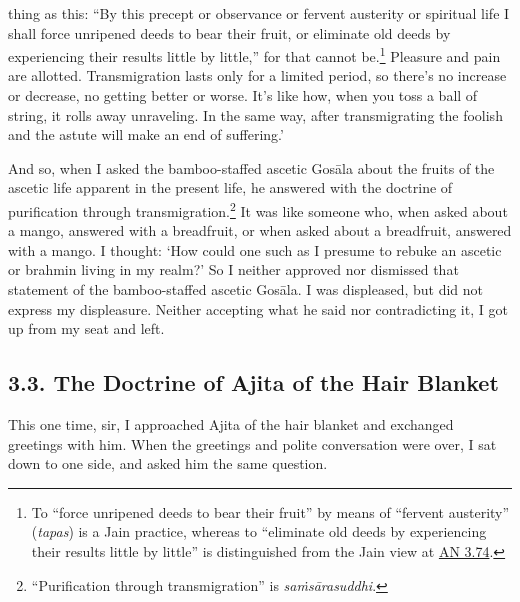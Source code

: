 \documentclass[12pt,openany]{book}%
\begin{document}
thing as this: “By this precept or observance or fervent austerity or spiritual life I shall force unripened deeds to bear their fruit, or eliminate old deeds by experiencing their results little by little,” for that cannot be.\footnote{To “force unripened deeds to bear their fruit” by means of “fervent austerity” (\textit{tapas}) is a Jain practice, whereas to “eliminate old deeds by experiencing their results little by little” is distinguished from the Jain view at \href{https://suttacentral.net/an3.74/en/sujato}{AN 3.74}. } Pleasure and pain are allotted. Transmigration lasts only for a limited period, so there’s no increase or decrease, no getting better or worse. It’s like how, when you toss a ball of string, it rolls away unraveling. In the same way, after transmigrating the foolish and the astute will make an end of suffering.’ 

And so, when I asked the bamboo-staffed ascetic \textsanskrit{Gosāla} about the fruits of the ascetic life apparent in the present life, he answered with the doctrine of purification through transmigration.\footnote{“Purification through transmigration” is \textit{\textsanskrit{saṁsārasuddhi}}. } It was like someone who, when asked about a mango, answered with a breadfruit, or when asked about a breadfruit, answered with a mango. I thought: ‘How could one such as I presume to rebuke an ascetic or brahmin living in my realm?’ So I neither approved nor dismissed that statement of the bamboo-staffed ascetic \textsanskrit{Gosāla}. I was displeased, but did not express my displeasure. Neither accepting what he said nor contradicting it, I got up from my seat and left. 

\subsection*{3.3. The Doctrine of Ajita of the Hair Blanket }

This one time, sir, I approached Ajita of the hair blanket and exchanged greetings with him. When the greetings and polite conversation were over, I sat down to one side, and asked him the same question. 
\end{document}
